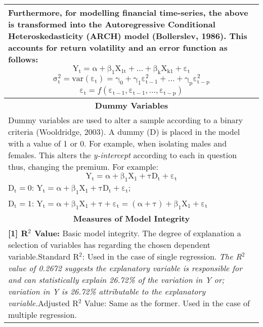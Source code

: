 \documentclass[11pt, english]{article}
\begin{document}
\begin{center}
\begin{longtable}{p{14cm}}
                Furthermore, for modelling financial time-series, the above is transformed into the Autoregressive Conditional Heteroskedasticity (ARCH) model (Bollerslev, 1986). This accounts for return volatility and an error function as follows:
                $$\mathrm{Y_t=\alpha+\beta_1X_{1t}+...+\beta_kX_{k1}+\varepsilon_t}$$
                $$\mathrm{\sigma_t^2=var(\varepsilon_t)=\gamma_0+\gamma_1\varepsilon_{t-1}^2+...+\gamma_p\varepsilon_{t-p}^2}$$
                $$\mathrm{\varepsilon_t=\textit{f}\left(\varepsilon_{t-1},\varepsilon_{t-1},...,\varepsilon_{t-p}\right)}$$\\
                \hline
                \multicolumn{1}{c}{\textbf{Dummy Variables}}\\
                \hline
                        Dummy variables are used to alter a sample according to a binary criteria (Wooldridge, 2003). A dummy (D) is placed in the model with a value of 1 or 0. For example, when isolating males and females. This alters the \textit{y-intercept} according to each in question thus, changing the premium. For example:
                        $$\mathrm{Y_t=\alpha+\beta_1X_1+\tau D_t+\varepsilon_t}$$
                        $\mathrm{D_t=0}$: $\mathrm{Y_t=\alpha+\beta_1X_1+\tau D_t+\varepsilon_t;}$\\ $\mathrm{D_t=1}$: $\mathrm{Y_t=\alpha+\beta_1X_1+\tau+\varepsilon_t=(\alpha+\tau)+\beta_1X_1+\varepsilon_t}$\\
                \hline
                \hline
                \multicolumn{1}{c}{\textbf{Measures of Model Integrity}}\\
                \hline
                \hline
		\textbf{[1] R$^2$ Value: }Basic model integrity. The degree of explanation a selection of variables has regarding the chosen dependent variable.\newline\newline
                [1.1] Standard R$^2$: Used in the case of single regression.\newline\newline
                \textit{The R$^2$ value of 0.2672 suggests the explanatory variable is responsible for and can statistically explain 26.72\% of the variation in Y or; variation in Y is 26.72\% attributable to the explanatory variable.}\newline\newline
                [1.2] Adjusted R$^2$ Value: Same as the former. Used in the case of multiple regression.\newline\newline

\end{longtable}
\end{center}
\end{document}
